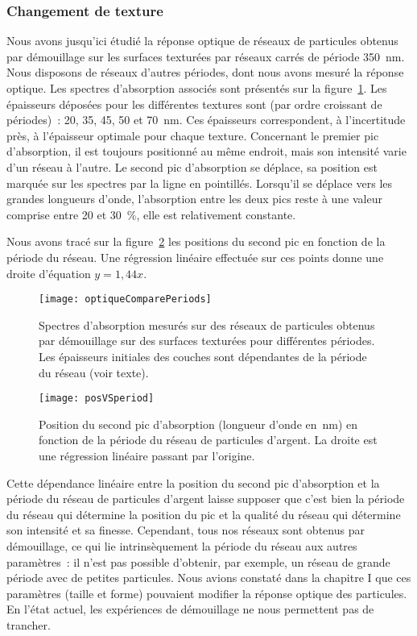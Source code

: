 	\subsubsection{Changement de texture}
Nous avons jusqu'ici étudié la réponse optique de réseaux de particules obtenus par démouillage sur les surfaces texturées par réseaux carrés de période 350~nm. Nous disposons de réseaux d'autres périodes, dont nous avons mesuré la réponse optique. Les spectres d'absorption associés sont présentés sur la figure~\ref{optiqueComparePeriods}. Les épaisseurs déposées pour les différentes textures sont (par ordre croissant de périodes)~: 20, 35, 45, 50 et 70~nm. Ces épaisseurs correspondent, à l'incertitude près, à l'épaisseur optimale pour chaque texture. Concernant le premier pic d'absorption, il est toujours positionné au même endroit, mais son intensité varie d'un réseau à l'autre. Le second pic d'absorption se déplace, sa position est marquée sur les spectres par la ligne en pointillés. Lorsqu'il se déplace vers les grandes longueurs d'onde, l'absorption entre les deux pics reste à une valeur comprise entre 20 et 30~\%, elle est relativement constante.\par
Nous avons tracé sur la figure~\ref{posVSperiod} les positions du second pic en fonction de la période du réseau. Une régression linéaire effectuée sur ces points donne une droite d'équation $y = 1,44x$.\par 
\begin{figure}[!htb]
\centering
\texttt{[image: optiqueComparePeriods]}
\caption{Spectres d’absorption mesurés sur des réseaux de particules obtenus par démouillage sur des surfaces texturées pour différentes périodes. Les épaisseurs initiales des couches sont dépendantes de la période du réseau (voir texte).}
\label{optiqueComparePeriods}
\end{figure}
\begin{figure}[!htb]
\centering
\texttt{[image: posVSperiod]}
\caption{Position du second pic d'absorption (longueur d'onde en~nm) en fonction de la période du réseau de particules d'argent. La droite est une régression linéaire passant par l'origine.}
\label{posVSperiod}
\end{figure}
Cette dépendance linéaire entre la position du second pic d'absorption et la période du réseau de particules d'argent laisse supposer que c'est bien la période du réseau qui détermine la position du pic et la qualité du réseau qui détermine son intensité et sa finesse. Cependant, tous nos réseaux sont obtenus par démouillage, ce qui lie intrinsèquement la période du réseau aux autres paramètres~: il n'est pas possible d'obtenir, par exemple, un réseau de grande période avec de petites particules. Nous avions constaté dans la chapitre I que ces paramètres (taille et forme) pouvaient modifier la réponse optique des particules. En l'état actuel, les expériences de démouillage ne nous permettent pas de trancher.\par 


